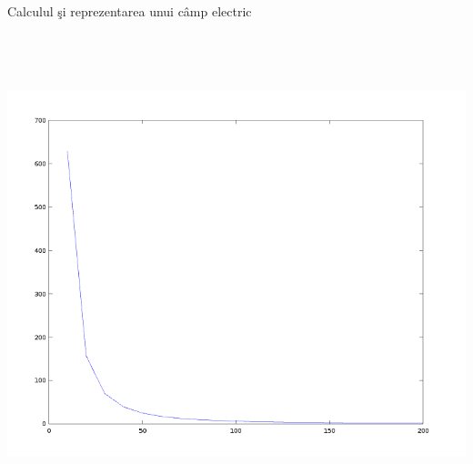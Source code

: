 \documentclass[a4paper]{article}
\begin{document}
\begin{section}{Calculul \c si reprezentarea unui c\^ amp electric \\}
\begin{center}
	\includegraphics[width=14cm, height=14cm]{graficsD.png}
\end{center}

\end{section}

\end{document}
